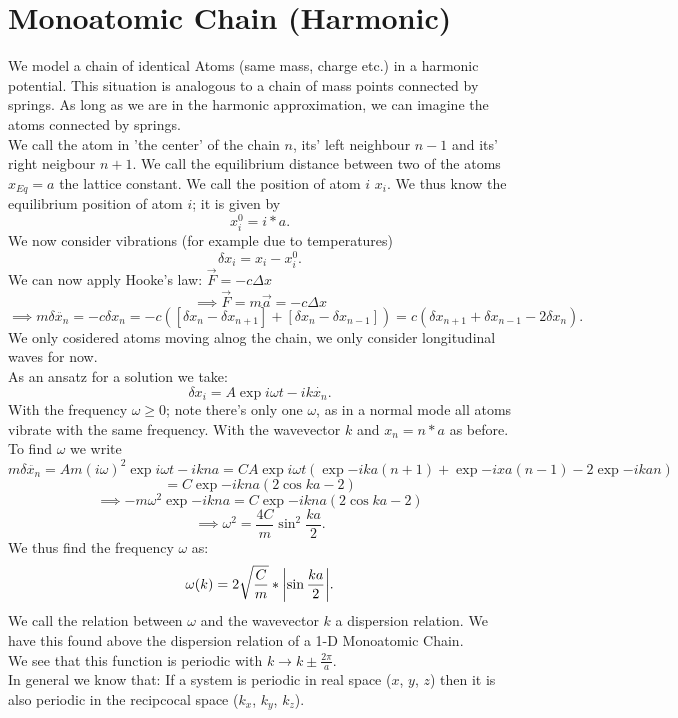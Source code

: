 \documentclass{report}
\begin{document}
\section{Monoatomic Chain (Harmonic)}
We model a chain of identical Atoms (same mass, charge etc.) in a harmonic potential. This situation is analogous to a chain of mass points connected by springs. As long as we are in the harmonic approximation, we can imagine the atoms connected by springs.\\
We call the atom in 'the center' of the chain $n$, its' left neighbour $n-1$ and its' right neigbour $n+1$. We call the equilibrium distance between two of the atoms $x_{Eq} = a$ the lattice constant. We call the position of atom $i$ $x_i$. We thus know the equilibrium position of atom $i$; it is given by \[
x_i^0 = i*a
.\] We now consider vibrations (for example due to temperatures) \[
\delta x_i = x_i - x_i^0
.\] We can now apply Hooke's law: $\vec{F} = -c \Delta x$ \[
\implies \vec{F} = m \vec{a} = -c \Delta x
\] \[
\implies m \delta \ddot{x_n} = - c \delta x_n = - c\left( [\delta x_n - \delta x_{n+1}] + [\delta x_n - \delta x_{n-1}] \right) = c \left( \delta x_{n+1} + \delta x_{n-1} - 2 \delta x_n \right) 
.\] We only cosidered atoms moving alnog the chain, we only consider longitudinal waves for now. \\
As an ansatz for a solution we take: \[
	\delta x_i = A \exp{i \omega t - i k \dot{x_n}}
.\] With the frequency $\omega \ge  0$; note there's only one $\omega$, as in a normal mode all atoms vibrate with the same frequency. With the wavevector $k$ and $x_n = n*a$ as before.
To find $\omega$ we write \[
	m \delta \ddot{x_n} = A m \left( i \omega \right)^2 \exp{i\omega t - i k n a} = C A \exp{i\omega t} \left( \exp{- i k a\left( n+1 \right) } + \exp{-ixa\left( n-1 \right) }- 2 \exp{-ikan} \right) 
\] \[
= C \exp{-ikna} \left( 2 \cos{k a} - 2 \right) 
\] \[
\implies -m\omega^2 \exp{-ikna} = C \exp{-ikna} \left( 2 \cos{ka} - 2 \right) 
\] \[
\implies \omega^2 = \frac{4C}{m}\sin^2{\frac{ka}{2}}
.\] We thus find the frequency $\omega$ as: \[
\omega(k) = 2 \sqrt{\frac{C}{m}} * \abs{\sin{\frac{ka}{2}}}
.\] We call the relation between $\omega$ and the wavevector $k$ a dispersion relation. We have this found above the dispersion relation of a 1-D Monoatomic Chain.\\
We see that this function is periodic with $k \to k \pm \frac{2 \pi}{a}$.\\
In general we know that: If a system is periodic in real space ($x$, $y$, $z$) then it is also periodic in the recipcocal space ($k_x$, $k_y$, $k_z$).\\
\end{document}
